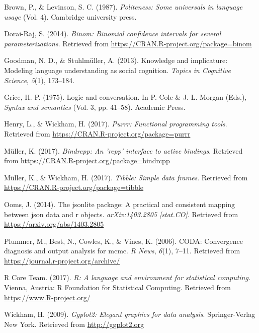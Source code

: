 \documentclass[english,floatsintext,man]{apa6}
\theoremstyle{definition}
\theoremstyle{definition}
\theoremstyle{definition}
\theoremstyle{remark}
\begin{document}
\leavevmode\hypertarget{ref-brown1987}{}%
Brown, P., \& Levinson, S. C. (1987). \emph{Politeness: Some universals
in language usage} (Vol. 4). Cambridge university press.

\leavevmode\hypertarget{ref-R-binom}{}%
Dorai-Raj, S. (2014). \emph{Binom: Binomial confidence intervals for
several parameterizations}. Retrieved from
\url{https://CRAN.R-project.org/package=binom}

\leavevmode\hypertarget{ref-goodman2013}{}%
Goodman, N. D., \& Stuhlmüller, A. (2013). Knowledge and implicature:
Modeling language understanding as social cognition. \emph{Topics in
Cognitive Science}, \emph{5}(1), 173--184.

\leavevmode\hypertarget{ref-grice1975}{}%
Grice, H. P. (1975). Logic and conversation. In P. Cole \& J. L. Morgan
(Eds.), \emph{Syntax and semantics} (Vol. 3, pp. 41--58). Academic
Press.

\leavevmode\hypertarget{ref-R-purrr}{}%
Henry, L., \& Wickham, H. (2017). \emph{Purrr: Functional programming
tools}. Retrieved from \url{https://CRAN.R-project.org/package=purrr}

\leavevmode\hypertarget{ref-R-bindrcpp}{}%
Müller, K. (2017). \emph{Bindrcpp: An 'rcpp' interface to active
bindings}. Retrieved from
\url{https://CRAN.R-project.org/package=bindrcpp}

\leavevmode\hypertarget{ref-R-tibble}{}%
Müller, K., \& Wickham, H. (2017). \emph{Tibble: Simple data frames}.
Retrieved from \url{https://CRAN.R-project.org/package=tibble}

\leavevmode\hypertarget{ref-R-jsonlite}{}%
Ooms, J. (2014). The jsonlite package: A practical and consistent
mapping between json data and r objects. \emph{arXiv:1403.2805
{[}stat.CO{]}}. Retrieved from \url{https://arxiv.org/abs/1403.2805}

\leavevmode\hypertarget{ref-R-coda}{}%
Plummer, M., Best, N., Cowles, K., \& Vines, K. (2006). CODA:
Convergence diagnosis and output analysis for mcmc. \emph{R News},
\emph{6}(1), 7--11. Retrieved from
\url{https://journal.r-project.org/archive/}

\leavevmode\hypertarget{ref-R-base}{}%
R Core Team. (2017). \emph{R: A language and environment for statistical
computing}. Vienna, Austria: R Foundation for Statistical Computing.
Retrieved from \url{https://www.R-project.org/}

\leavevmode\hypertarget{ref-R-ggplot2}{}%
Wickham, H. (2009). \emph{Ggplot2: Elegant graphics for data analysis}.
Springer-Verlag New York. Retrieved from \url{http://ggplot2.org}
\end{document}
